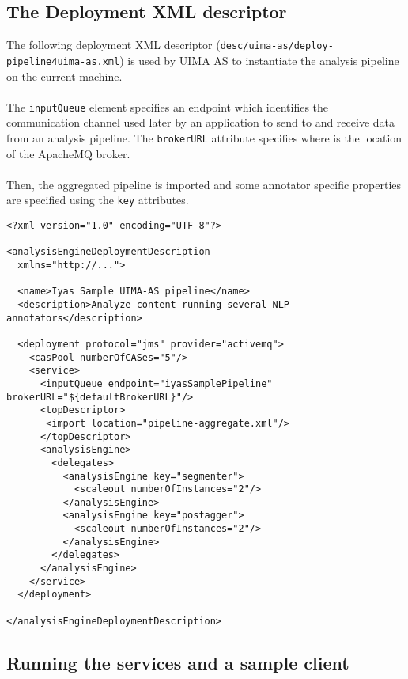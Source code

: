 \documentclass{wileysev}
\begin{document}
\subsection{The Deployment XML descriptor}

The following deployment XML descriptor (\texttt{desc/uima-as/deploy-pipeline4uima-as.xml}) is used by UIMA AS to instantiate the analysis pipeline on the current machine.
\\\\
The \texttt{inputQueue} element specifies an endpoint which identifies the communication channel used later by an application to send to and receive data from an analysis pipeline. The \texttt{brokerURL} attribute specifies where is the location of the ApacheMQ broker.
\\\\
Then, the aggregated pipeline is imported and some annotator specific properties are specified using the \texttt{key} attributes.

\lstset{language=XML}
\begin{lstlisting}
<?xml version="1.0" encoding="UTF-8"?>

<analysisEngineDeploymentDescription 
  xmlns="http://...">
  
  <name>Iyas Sample UIMA-AS pipeline</name>
  <description>Analyze content running several NLP annotators</description>
  
  <deployment protocol="jms" provider="activemq">
	<casPool numberOfCASes="5"/>
    <service>
      <inputQueue endpoint="iyasSamplePipeline" brokerURL="${defaultBrokerURL}"/>
      <topDescriptor>
       <import location="pipeline-aggregate.xml"/> 
      </topDescriptor>
      <analysisEngine>
        <delegates>
          <analysisEngine key="segmenter">
            <scaleout numberOfInstances="2"/>              
          </analysisEngine>
          <analysisEngine key="postagger">
            <scaleout numberOfInstances="2"/>              
          </analysisEngine>
        </delegates>
      </analysisEngine>
    </service>
  </deployment>

</analysisEngineDeploymentDescription>
\end{lstlisting}

\subsection{Running the services and a sample client}
\end{document}
